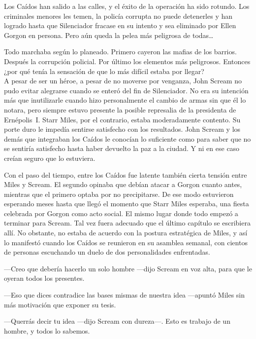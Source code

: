 \begin{prev}
    Los Caídos han salido a las calles, y el éxito de la operación ha sido rotundo. Los criminales menores les temen, la policía corrupta no puede detenerles y han logrado hasta que Silenciador fracase en su intento y sea eliminado por Ellen Gorgon en persona. Pero aún queda la pelea más peligrosa de todas\dots{}
\end{prev}

\noindent{}Todo marchaba según lo planeado. Primero cayeron las mafias de los barrios. Después la corrupción policial. Por último los elementos más peligrosos. Entonces ¿por qué tenía la sensación de que lo más difícil estaba por llegar?\\

\noindent{}A pesar de ser un héroe, a pesar de no moverse por venganza, John Scream no pudo evitar alegrarse cuando se enteró del fin de Silenciador. No era su intención más que inutilizarle cuando hizo personalmente el cambio de armas sin que él lo notara, pero siempre estuvo presente la posible represalia de la presidenta de Ernépolis~I. Starr Miles, por el contrario, estaba moderadamente contento. Su porte duro le impedía sentirse satisfecho con los resultados. John Scream y los demás que integraban los Caídos le conocían lo suficiente como para saber que no se sentiría satisfecho hasta haber devuelto la paz a la ciudad. Y ni en ese caso creían seguro que lo estuviera.

Con el paso del tiempo, entre los Caídos fue latente también cierta tensión entre Miles y Scream. El segundo opinaba que debían atacar a Gorgon cuanto antes, mientras que el primero optaba por no precipitarse. De ese modo estuvieron esperando meses hasta que llegó el momento que Starr Miles esperaba, una fiesta celebrada por Gorgon como acto social. El mismo lugar donde todo empezó a terminar para Scream. Tal vez fuera adecuado que el último capítulo se escribiera allí. No obstante, no estaba de acuerdo con la postura estratégica de Miles, y así lo manifestó cuando los Caídos se reunieron en su asamblea semanal, con cientos de personas escuchando un duelo de dos personalidades enfrentadas.

---Creo que debería hacerlo un solo hombre ---dijo Scream en voz alta, para que le oyeran todos los presentes.

---Eso que dices contradice las bases mismas de nuestra idea ---apuntó Miles sin más motivación que exponer su tesis.

---Querrás decir tu idea ---dijo Scream con dureza---. Esto es trabajo de un hombre, y todos lo sabemos.

